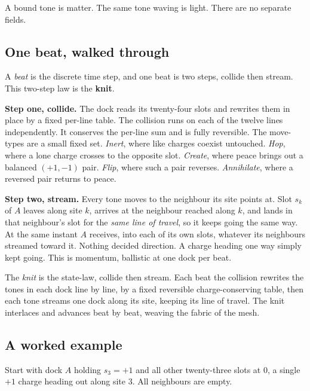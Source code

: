 A bound tone is matter. The same tone waving is light. There are no separate fields.

\subsection{One beat, walked through}

A \emph{beat} is the discrete time step, and one beat is two steps, collide then stream. This two-step law is the \textbf{knit}.

\textbf{Step one, collide.} The dock reads its twenty-four slots and rewrites them in place by a fixed per-line table. The collision runs on each of the twelve lines independently. It conserves the per-line sum and is fully reversible. The move-types are a small fixed set. \emph{Inert}, where like charges coexist untouched. \emph{Hop}, where a lone charge crosses to the opposite slot. \emph{Create}, where peace brings out a balanced $(+1, -1)$ pair. \emph{Flip}, where such a pair reverses. \emph{Annihilate}, where a reversed pair returns to peace.

\textbf{Step two, stream.} Every tone moves to the neighbour its site points at. Slot $s_k$ of $A$ leaves along site $k$, arrives at the neighbour reached along $k$, and lands in that neighbour's slot for the \emph{same line of travel}, so it keeps going the same way. At the same instant $A$ receives, into each of its own slots, whatever its neighbours streamed toward it. Nothing decided direction. A charge heading one way simply kept going. This is momentum, ballistic at one dock per beat.

\begin{definition}
The \emph{knit} is the state-law, collide then stream. Each beat the collision rewrites the tones in each dock line by line, by a fixed reversible charge-conserving table, then each tone streams one dock along its site, keeping its line of travel. The knit interlaces and advances beat by beat, weaving the fabric of the mesh.
\end{definition}

\subsection{A worked example}

Start with dock $A$ holding $s_3 = +1$ and all other twenty-three slots at $0$, a single $+1$ charge heading out along site $3$. All neighbours are empty.

